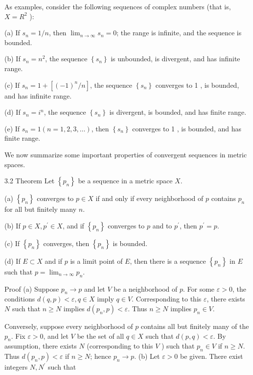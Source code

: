 \documentclass[10pt]{article}
\begin{document}
As examples, consider the following sequences of complex numbers (that is, $X=R^{2}$ ):

(a) If $s_{n}=1 / n$, then $\lim _{n \rightarrow \infty} s_{n}=0$; the range is infinite, and the sequence is bounded.

(b) If $s_{n}=n^{2}$, the sequence $\left\{s_{n}\right\}$ is unbounded, is divergent, and has infinite range.

(c) If $s_{n}=1+\left[(-1)^{n} / n\right]$, the sequence $\left\{s_{n}\right\}$ converges to 1 , is bounded, and has infinite range.

(d) If $s_{n}=i^{n}$, the sequence $\left\{s_{n}\right\}$ is divergent, is bounded, and has finite range.

(e) If $s_{n}=1(n=1,2,3, \ldots)$, then $\left\{s_{n}\right\}$ converges to 1 , is bounded, and has finite range.

We now summarize some important properties of convergent sequences in metric spaces.

3.2 Theorem Let $\left\{p_{n}\right\}$ be a sequence in a metric space $X$.

(a) $\left\{p_{n}\right\}$ converges to $p \in X$ if and only if every neighborhood of $p$ contains $p_{n}$ for all but finitely many $n$.

(b) If $p \in X, p^{\prime} \in X$, and if $\left\{p_{n}\right\}$ converges to $p$ and to $p^{\prime}$, then $p^{\prime}=p$.

(c) If $\left\{p_{n}\right\}$ converges, then $\left\{p_{n}\right\}$ is bounded.

(d) If $E \subset X$ and if $p$ is a limit point of $E$, then there is a sequence $\left\{p_{n}\right\}$ in $E$ such that $p=\lim _{n \rightarrow \infty} p_{n}$.

Proof (a) Suppose $p_{n} \rightarrow p$ and let $V$ be a neighborhood of $p$. For some $\varepsilon>0$, the conditions $d(q, p)<\varepsilon, q \in X$ imply $q \in V$. Corresponding to this $\varepsilon$, there exists $N$ such that $n \geq N$ implies $d\left(p_{n}, p\right)<\varepsilon$. Thus $n \geq N$ implies $p_{n} \in V$.

Conversely, suppose every neighborhood of $p$ contains all but finitely many of the $p_{n}$. Fix $\varepsilon>0$, and let $V$ be the set of all $q \in X$ such that $d(p, q)<\varepsilon$. By assumption, there exists $N$ (corresponding to this $V$ ) such that $p_{n} \in V$ if $n \geq N$. Thus $d\left(p_{n}, p\right)<\varepsilon$ if $n \geq N$; hence $p_{n} \rightarrow p$. (b) Let $\varepsilon>0$ be given. There exist integers $N, N^{\prime}$ such that
\end{document}
